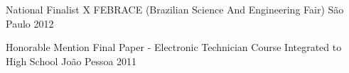 \begin{cvhonors}
  \cvhonor
    {National Finalist}
    {X FEBRACE (Brazilian Science And Engineering Fair)}
    {São Paulo}
    {2012} %

  \cvhonor
    {Honorable Mention}
    {Final Paper - Electronic Technician Course Integrated to High School}
    {João Pessoa}
    {2011} %
%
\end{cvhonors}
